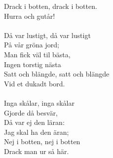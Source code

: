 Drack i botten, drack i botten.\\ 
Hurra och gutår!\\ 
 \\ 
\revrpt Då var lustigt, då var lustigt\\ 
På vår gröna jord; \rpt \\ 
Man fick väl til bästa,\\ 
Ingen torstig nästa\\ 
Satt och blängde, satt och blängde\\ 
Vid et dukadt bord.\\ 
 \\ 
\revrpt Inga skålar, inga skålar\\ 
Gjorde då besvär, \rpt \\ 
Då var ej den läran:\\ 
Jag skal ha den äran;\\ 
Nej i botten, nej i botten\\ 
Drack man ur så här.\\ 
